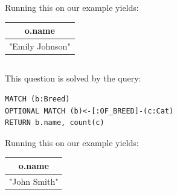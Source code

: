 \documentclass{article}
\begin{document}
Running this on our example yields:\\
\begin{center}
\begin{tabular}{|c|}
    \hline
    \textbf{o.name} \\
    \hline
    "Emily Johnson" \\
    \hline
\end{tabular}
\end{center}


\subsection{}
This question is solved by the query:
\begin{lstlisting}
MATCH (b:Breed)
OPTIONAL MATCH (b)<-[:OF_BREED]-(c:Cat)
RETURN b.name, count(c)
\end{lstlisting}

Running this on our example yields:\\
\begin{center}
\begin{tabular}{|c|}
    \hline
    \textbf{o.name} \\
    \hline
    "John Smith" \\
    \hline
\end{tabular}
\end{center}
\end{document}
